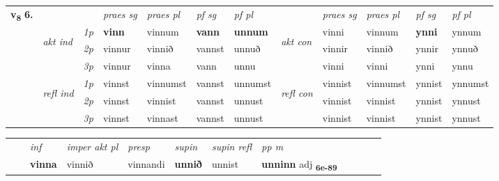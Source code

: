 \begin{tabular}{llllllllllll} \toprule
\multirow{4}{*}{{{\textbf{v{\textsubscript{8}}} \Large{\textbf{6.}}}}}  & &   &  \textit{praes sg}  & \textit{praes pl}  &\textit{ pf sg} & \textit{pf pl} &  &  \textit{praes sg}  & \textit{praes pl}  & \textit{pf sg} & \textit{pf pl } \\*
	\cmidrule{4-7} \cmidrule{9-12}
 & \multirow{3}{*}{\begin{turn}{90}\textit{akt ind}\end{turn}} & {\textit{1p}} & \textbf{vinn} & vinnum    & \textbf{vann} & \textbf{unnum} & \multirow{3}{*}{\begin{turn}{90}\textit{akt con}\end{turn}} &vinni & vinnum & \textbf{ynni} & ynnum\\*
& &  {\textit{2p}} &  vinnur  & vinnið   & vannst & unnuð & & vinnir & vinnið & ynnir & ynnuð \\*
& &  {\textit{3p}} & vinnur & vinna   & vann & unnu & & vinni & vinni& ynni & ynnu  \\*
\cmidrule{4-7} \cmidrule{9-12}
 &\multirow{3}{*}{\begin{turn}{90}\textit{refl ind}\end{turn}} & {\textit{1p}} & vinnst & vinnumst    & vannst & unnumst & \multirow{3}{*}{\begin{turn}{90}\textit{refl con}\end{turn}}  &vinnist & vinnumst & ynnist & ynnumst\\*
 &&  {\textit{2p}} &  vinnst  & vinnist   & vannst & unnust & &vinnist & vinnist & ynnist & ynnust \\*
& &  {\textit{3p}} & vinnst & vinnast   & vannst & unnust & & vinnist & vinnist& ynnist & ynnust  \\*
\cmidrule{4-7} \cmidrule{9-12}
\end{tabular}


\begin{tabular}{llllllllllll}
 & & \textit{inf}  & \textit{imper akt pl}   & \textit{presp} & \textit{supin} & \textit{supin refl} & \textit{pp m}     \\*
  & & \textbf{vinna}   & vinnið   & vinnandi &  \textbf{unnið} & unnist & \textbf{unninn} adj \textbf{\textsubscript{6e-89}} \\*
\cmidrule{1-12}
\end{tabular}



